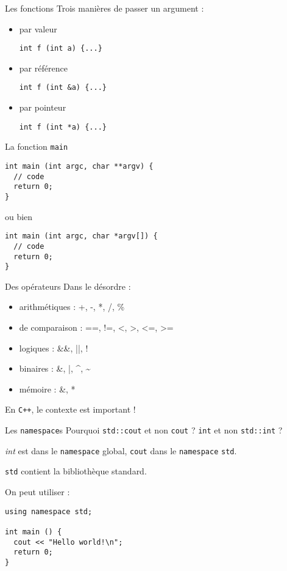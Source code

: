 \begin{frame}[fragile]{Les fonctions}
  Trois manières de passer un argument :
  \begin{itemize}
  \item par valeur
    \begin{lstlisting}
int f (int a) {...}
    \end{lstlisting}
  \item par référence
    \begin{lstlisting}
int f (int &a) {...}
    \end{lstlisting}
  \item par pointeur
    \begin{lstlisting}
int f (int *a) {...}
    \end{lstlisting}
  \end{itemize}
\end{frame}

\begin{frame}[fragile]{La fonction \texttt{main}}
  \begin{lstlisting}
int main (int argc, char **argv) {
  // code
  return 0;
}
  \end{lstlisting}
 ou bien
  \begin{lstlisting}
int main (int argc, char *argv[]) {
  // code
  return 0;
}
  \end{lstlisting}
\end{frame}

\begin{frame}{Des opérateurs}
  Dans le désordre :
  \begin{itemize}
  \item arithmétiques : +, -, *, /, \%
  \item de comparaison : ==, !=, <, >, <=, >=
  \item logiques : \&\&, ||, !
  \item binaires : \&, |, \^{}, \~{}
  \item mémoire : \&, *
  \end{itemize}

  En \texttt{C++}, le contexte est important !
\end{frame}

\begin{frame}[fragile]{Les \texttt{namespace}s}
  Pourquoi \texttt{std::cout} et non \texttt{cout} ? \texttt{int} et non \texttt{std::int} ?
  
  \textit{int} est dans le \texttt{namespace} global, \texttt{cout} dans le \texttt{namespace} \texttt{std}.
  
  \texttt{std} contient la bibliothèque standard.

  On peut utiliser :
  \begin{lstlisting}
using namespace std;

int main () {
  cout << "Hello world!\n";
  return 0;
}
  \end{lstlisting}
\end{frame}

